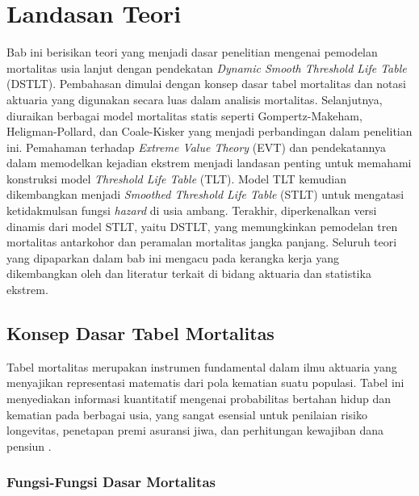 \chapter{Landasan Teori}

Bab ini berisikan teori yang menjadi dasar penelitian mengenai pemodelan mortalitas usia lanjut dengan pendekatan \textit{Dynamic Smooth Threshold Life Table} (DSTLT). Pembahasan dimulai dengan konsep dasar tabel mortalitas dan notasi aktuaria yang digunakan secara luas dalam analisis mortalitas. Selanjutnya, diuraikan berbagai model mortalitas statis seperti Gompertz-Makeham, Heligman-Pollard, dan Coale-Kisker yang menjadi perbandingan dalam penelitian ini. Pemahaman terhadap \textit{Extreme Value Theory} (EVT) dan pendekatannya dalam memodelkan kejadian ekstrem menjadi landasan penting untuk memahami konstruksi model \textit{Threshold Life Table} (TLT). Model TLT kemudian dikembangkan menjadi \textit{Smoothed Threshold Life Table} (STLT) untuk mengatasi ketidakmulsan fungsi \textit{hazard} di usia ambang. Terakhir, diperkenalkan versi dinamis dari model STLT, yaitu DSTLT, yang memungkinkan pemodelan tren mortalitas antarkohor dan peramalan mortalitas jangka panjang. Seluruh teori yang dipaparkan dalam bab ini mengacu pada kerangka kerja yang dikembangkan oleh \citet{huang2020modelling} dan literatur terkait di bidang aktuaria dan statistika ekstrem.

\section{Konsep Dasar Tabel Mortalitas}

Tabel mortalitas merupakan instrumen fundamental dalam ilmu aktuaria yang menyajikan representasi matematis dari pola kematian suatu populasi. Tabel ini menyediakan informasi kuantitatif mengenai probabilitas bertahan hidup dan kematian pada berbagai usia, yang sangat esensial untuk penilaian risiko longevitas, penetapan premi asuransi jiwa, dan perhitungan kewajiban dana pensiun \citep{dickson2020actuarial}.

\subsection{Fungsi-Fungsi Dasar Mortalitas}

